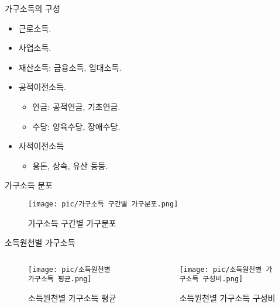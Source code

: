 \documentclass[aspectratio=169,xcolor=dvipsnames,handout]{beamer}
\begin{document}
\begin{frame}{가구소득의 구성}
    \begin{itemize}
        \item 근로소득.
        \item 사업소득.
        \item 재산소득: 금융소득, 임대소득.
        \item 공적이전소득.
        \begin{itemize}
            \item 연금: 공적연금, 기초연금.
            \item 수당: 양육수당, 장애수당.
        \end{itemize}
        \item 사적이전소득
        \begin{itemize}
            \item 용돈, 상속, 유산 등등. 
        \end{itemize}
    \end{itemize}
\end{frame}

\begin{frame}{가구소득 분포}
\centering
\begin{figure}
    \texttt{[image: pic/가구소득 구간별 가구분포.png]}
    \caption{가구소득 구간별 가구분포}
\end{figure}
\end{frame}

\begin{frame}{소득원천별 가구소득}
\begin{columns}
    \begin{column}{.5\textwidth}
        \begin{figure}
            \centering
            \texttt{[image: pic/소득원천별 가구소득 평균.png]}
            \caption{소득원천별 가구소득 평균}
        \end{figure}
    \end{column}    
    \begin{column}{.5\textwidth}
        \begin{figure}
            \centering
            \texttt{[image: pic/소득원천별 가구소득 구성비.png]}
            \caption{소득원천별 가구소득 구성비}
        \end{figure}
    \end{column}    
\end{columns}
\end{frame}
\end{document}
